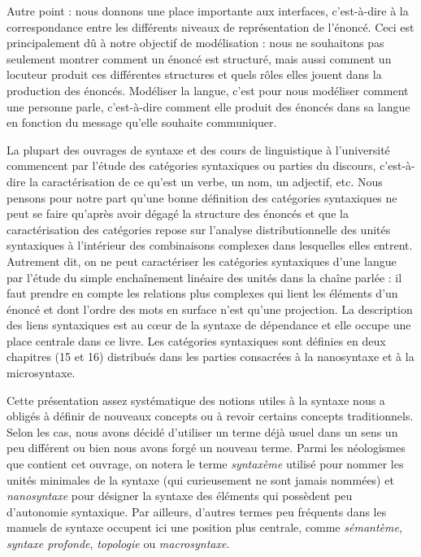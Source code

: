 Autre point : nous donnons une place importante aux interfaces, c’est-à-dire à la correspondance entre les différents niveaux de représentation de l’énoncé. Ceci est principalement dû à notre objectif de modélisation : nous ne souhaitons pas seulement montrer comment un énoncé est structuré, mais aussi comment un locuteur produit ces différentes structures et quels rôles elles jouent dans la production des énoncés. Modéliser la langue, c’est pour nous modéliser comment une personne parle, c’est-à-dire comment elle produit des énoncés dans sa langue en fonction du message qu’elle souhaite communiquer.

La plupart des ouvrages de syntaxe et des cours de linguistique à l’université commencent par l’étude des catégories syntaxiques ou parties du discours, c’est-à-dire la caractérisation de ce qu’est un verbe, un nom, un adjectif, etc. Nous pensons pour notre part qu’une bonne définition des catégories syntaxiques ne peut se faire qu’après avoir dégagé la structure des énoncés et que la caractérisation des catégories repose sur l’analyse distributionnelle des unités syntaxiques à l’intérieur des combinaisons complexes dans lesquelles elles entrent. Autrement dit, on ne peut caractériser les catégories syntaxiques d’une langue par l’étude du simple enchaînement linéaire des unités dans la chaîne parlée : il faut prendre en compte les relations plus complexes qui lient les éléments d’un énoncé et dont l’ordre des mots en surface n’est qu’une projection. La description des liens syntaxiques est au cœur de la syntaxe de dépendance et elle occupe une place centrale dans ce livre. Les catégories syntaxiques sont définies en deux chapitres (15 et 16)
distribués dans les parties consacrées à la nanosyntaxe et à la microsyntaxe.

Cette présentation assez systématique des notions utiles à la syntaxe nous a obligés à définir de nouveaux concepts ou à revoir certains concepts traditionnels. Selon les cas, nous avons décidé d’utiliser un terme déjà usuel dans un sens un peu différent ou bien nous avons forgé un nouveau terme. Parmi les néologismes que contient cet ouvrage, on notera le terme \textit{syntaxème} utilisé pour nommer les unités minimales de la syntaxe (qui curieusement ne sont jamais nommées) et \textit{nanosyntaxe} pour désigner la syntaxe des éléments qui possèdent peu d’autonomie syntaxique. Par ailleurs, d’autres termes peu fréquents dans les manuels de syntaxe occupent ici une position plus centrale, comme \textit{sémantème}, \textit{syntaxe profonde}, \textit{topologie} ou \textit{macrosyntaxe}.


